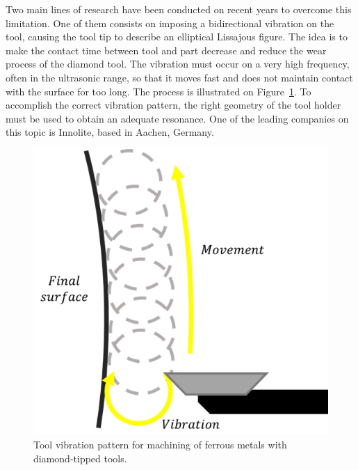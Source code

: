 	Two main lines of research have been conducted on recent years to overcome this limitation. One of them consists on imposing a bidirectional vibration on the tool, causing the tool tip to describe an elliptical Lissajous figure. The idea is to make the contact time between tool and part decrease and reduce the wear process of the diamond tool. The vibration must occur on a very high frequency, often in the ultrasonic range, so that it moves fast and does not maintain contact with the surface for too long. The process is illustrated on Figure~\ref{fig:toolvibration}. To accomplish the correct vibration pattern, the right geometry of the tool holder must be used to obtain an adequate resonance. One of the leading companies on this topic is Innolite, based in Aachen, Germany.\newline
	
	\begin{figure}[H]
		\centering
		\captionsetup{justification=centering}
		\includegraphics[width=0.7\linewidth]{Cap2/Diamondturning/toolvibration.jpg}
		\caption{Tool vibration pattern for machining of ferrous metals with diamond-tipped tools.}
		\label{fig:toolvibration}
	\end{figure}
	
	\newpage